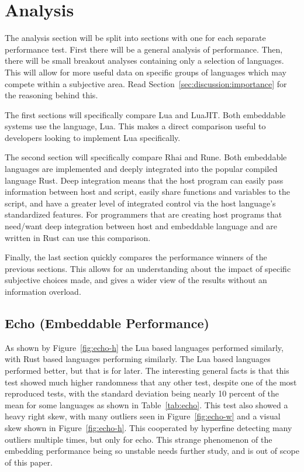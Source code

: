 \section{Analysis} \label{sec:analysis}
The analysis section will be split into sections with one for each separate performance test. First there will be a general analysis of performance. Then, there will be small breakout analyses containing only a selection of languages. This will allow for more useful data on specific groups of languages which may compete within a subjective area. Read Section~\ref{sec:discussion:importance} for the reasoning behind this.

The first sections will specifically compare Lua and LuaJIT. Both embeddable systems use the language, Lua. This makes a direct comparison useful to developers looking to implement Lua specifically.

The second section will specifically compare Rhai and Rune. Both embeddable languages are implemented and deeply integrated into the popular compiled language Rust. Deep integration means that the host program can easily pass information between host and script, easily share functions and variables to the script, and have a greater level of integrated control via the host language's standardized features. For programmers that are creating host programs that need/want deep integration between host and embeddable language and are written in Rust can use this comparison.

Finally, the last section quickly compares the performance winners of the previous sections. This allows for an understanding about the impact of specific subjective choices made, and gives a wider view of the results without an information overload.

\subsection{Echo (Embeddable Performance)} \label{sec:analysis:echo}
As shown by Figure~\ref{fig:echo-h} the Lua based languages performed similarly, with Rust based languages performing similarly. The Lua based languages performed better, but that is for later. The interesting general facts is that this test showed much higher randomness that any other test, despite one of the most reproduced tests, with the standard deviation being nearly 10 percent of the mean for some languages as shown in Table~\ref{tab:echo}. This test also showed a heavy right skew, with many outliers seen in Figure~\ref{fig:echo-w} and a visual skew shown in Figure~\ref{fig:echo-h}. This cooperated by hyperfine detecting many outliers multiple times, but only for echo. This strange phenomenon of the embedding performance being so unstable needs further study, and is out of scope of this paper.


